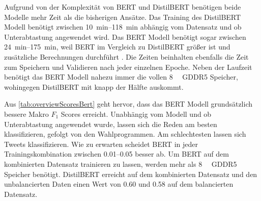 Aufgrund von der Komplexität von \ac{BERT} und DistilBERT benötigen beide Modelle mehr Zeit als die bisherigen Ansätze. Das Training des DistilBERT Modell benötigt zwischen \SIrange{10}{118}{\minute} abhängig vom Datensatz und ob Unterabtastung angewendet wird. Das \ac{BERT} Modell benötigt sogar zwischen \SIrange{24}{175}{\minute}, weil \ac{BERT} im Vergleich zu DistilBERT größer ist und zusätzliche Berechnungen durchführt \autocite{sanh_distilbert_2020}. Die Zeiten beinhalten ebenfalls die Zeit zum Speichern und Validieren nach jeder einzelnen Epoche. Neben der Laufzeit benötigt das \ac{BERT} Modell nahezu immer die vollen \SI{8}{\giga\byte} \ac{GDDR5} Speicher, wohingegen DistilBERT mit knapp der Hälfte auskommt.

Aus \autoref{tab:overviewScoresBert} geht hervor, dass das \ac{BERT} Modell grundsätzlich bessere Makro \(F_1\) Scores erreicht. Unabhängig vom Modell und ob Unterabtastung angewendet wurde, lassen sich die Reden am besten klassifizieren, gefolgt von den Wahlprogrammen. Am schlechtesten lassen sich Tweets klassifizieren. Wie zu erwarten scheidet \ac{BERT} in jeder Trainingskombination zwischen \numrange{0.01}{0.05} besser ab. Um \ac{BERT} auf dem kombinierten Datensatz trainieren zu lassen, werden mehr als \SI{8}{\giga\byte} \ac{GDDR5} Speicher benötigt. DistilBERT erreicht auf dem kombinierten Datensatz und den unbalancierten Daten einen Wert von \num{0.60} und \num{0.58} auf dem balancierten Datensatz.

